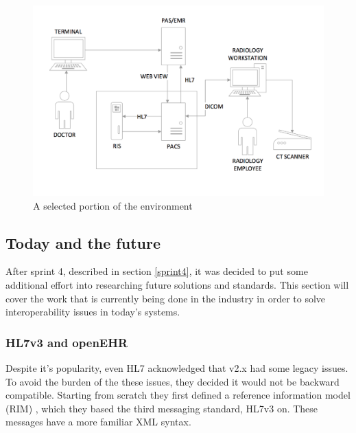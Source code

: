 \begin{figure}[H]
\centering
\includegraphics[scale=0.6]{img/env_chart.png}
\caption{A selected portion of the environment}
\label{fig:theEnvironment}
\end{figure}



\subsection{Today and the future}
After sprint 4, described in section \ref{sprint4}, it was decided to put some additional effort into researching future solutions and standards. This section will cover the work that is currently being done in the industry in order to solve interoperability issues in today's systems.

\subsubsection{HL7v3 and openEHR}
Despite it's popularity, even HL7 acknowledged that v2.x had some legacy issues. To avoid the burden of the these issues, they decided it would not be backward compatible. Starting from scratch they first defined a reference information model (RIM) \cite{hl7RIM}, which they based the third messaging standard, HL7v3 on. These messages have a more familiar XML syntax.

